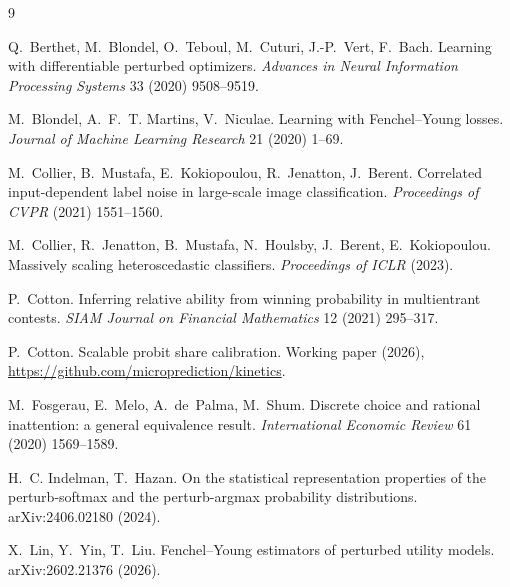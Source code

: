 \documentclass[11pt]{article}
\theoremstyle{remark}
\begin{document}
\begin{thebibliography}{9}

 Q.~Berthet, M.~Blondel, O.~Teboul, M.~Cuturi,
J.-P.~Vert, F.~Bach. Learning with differentiable perturbed optimizers.
\emph{Advances in Neural Information Processing Systems} 33 (2020)
9508--9519.

 M.~Blondel, A.~F.~T. Martins, V.~Niculae.
Learning with Fenchel--Young losses. \emph{Journal of Machine Learning
Research} 21 (2020) 1--69.

 M.~Collier, B.~Mustafa, E.~Kokiopoulou,
R.~Jenatton, J.~Berent. Correlated input-dependent label noise in
large-scale image classification. \emph{Proceedings of CVPR} (2021)
1551--1560.

 M.~Collier, R.~Jenatton,
B.~Mustafa, N.~Houlsby, J.~Berent, E.~Kokiopoulou. Massively scaling
heteroscedastic classifiers. \emph{Proceedings of ICLR} (2023).

 P.~Cotton. Inferring relative
ability from winning probability in multientrant contests. \emph{SIAM
Journal on Financial Mathematics} 12 (2021) 295--317.

 P.~Cotton. Scalable probit share
calibration. Working paper (2026),
\url{https://github.com/microprediction/kinetics}.

 M.~Fosgerau, E.~Melo, A.~de~Palma, M.~Shum.
Discrete choice and rational inattention: a general equivalence result.
\emph{International Economic Review} 61 (2020) 1569--1589.

 H.~C. Indelman,
T.~Hazan. On the statistical representation properties of the
perturb-softmax and the perturb-argmax probability distributions.
arXiv:2406.02180 (2024).

 X.~Lin, Y.~Yin,
T.~Liu. Fenchel--Young estimators of perturbed utility models.
arXiv:2602.21376 (2026).

\end{thebibliography}
\end{document}

